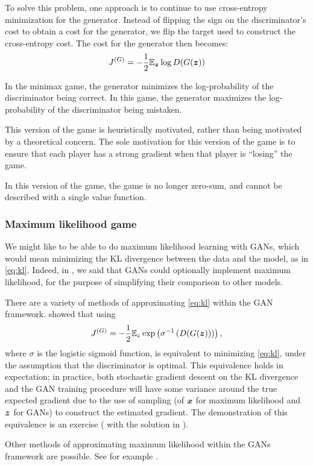 To solve this problem, one approach is to continue to use cross-entropy minimization for the
generator.
Instead of flipping the sign on the discriminator's cost to obtain a cost for the generator,
we flip the target used to construct the cross-entropy cost.
The cost for the generator then becomes:
\[
  J^{(G)} = -\frac{1}{2} \mathbb{E}_{\bm{z}} \log D(G({\bm{z}}))
\]

In the minimax game, the generator minimizes the log-probability of the discriminator being correct.
In this game, the generator maximizes the log-probability of the discriminator being mistaken.

This version of the game is heuristically motivated, rather than being motivated by a theoretical
concern.
The sole motivation for this version of the game is to ensure that each player has a strong
gradient when that player is ``losing'' the game.

In this version of the game, the game is no longer zero-sum, and cannot be described with a single
value function.

\subsubsection{Maximum likelihood game}
\label{sec:mle_gan}

We might like to be able to do maximum likelihood learning with GANs, which would mean minimizing
the KL divergence between the data and the model, as in \eqref{eq:kl}.
Indeed, in , we said that GANs could optionally implement maximum likelihood,
for the purpose of simplifying their comparison to other models.

There are a variety of methods of approximating \eqref{eq:kl} within the GAN
framework.
\citet{Goodfellow-ICLR2015} showed that using
\[ J^{(G)} = -\frac{1}{2} \mathbb{E}_z \exp\left( \sigma^{-1} \left( D(G({\bm{z}})) \right) \right), \]
  where $\sigma$ is the logistic sigmoid function, is equivalent to minimizing \eqref{eq:kl},
  under the assumption that the discriminator is optimal.
  This equivalence holds in expectation; in practice, both stochastic gradient descent on the KL
  divergence and the GAN training procedure will have some variance around the true expected
  gradient due to the use of sampling (of ${\bm{x}}$ for maximum likelihood and ${\bm{z}}$ for GANs)
  to construct the estimated gradient.
  The demonstration of this equivalence is an exercise (
  with the solution in ).


  Other methods of approximating maximum likelihood within the GANs framework are possible.
  See for example \citet{nowozin2016f}.
  

